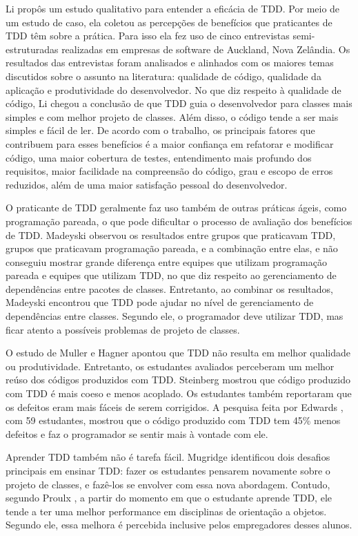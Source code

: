 \documentclass[conference]{IEEEtran}
\begin{document}
Li \cite{angela-li} propôs um estudo qualitativo para
entender a eficácia de TDD. Por meio de um estudo de caso, ela coletou as 
percepções de benefícios que praticantes de TDD têm sobre a prática. Para isso ela
fez uso de cinco entrevistas semi-estruturadas realizadas em empresas de software de 
Auckland, Nova Zelândia. Os resultados das entrevistas foram analisados e alinhados
com os maiores temas discutidos sobre o assunto na literatura: qualidade de código,
qualidade da aplicação e produtividade do desenvolvedor.
No que diz respeito à qualidade de código, Li chegou a conclusão de
que TDD guia o desenvolvedor para classes mais simples e com melhor projeto de classes. 
Além disso, o código tende a ser mais simples e fácil de ler.
De acordo com o trabalho, os principais fatores que contribuem para esses benefícios
é a maior confiança em refatorar e modificar código, uma maior cobertura de testes,
entendimento mais profundo dos requisitos, maior facilidade na compreensão do código,
grau e escopo de erros reduzidos, além de uma maior satisfação pessoal do desenvolvedor.

O praticante de TDD geralmente faz uso também de outras práticas ágeis, como
programação pareada, o que pode dificultar o processo de avaliação dos benefícios
de TDD. Madeyski \cite{madeyski-package-dependencies} observou os resultados
entre grupos que praticavam TDD, grupos que praticavam programação pareada, 
e a combinação entre elas,
e não conseguiu mostrar grande diferença entre equipes que utilizam programação 
pareada e equipes que utilizam TDD, no que diz respeito ao gerenciamento de dependências entre 
pacotes de classes. Entretanto, ao combinar os resultados, Madeyski encontrou que TDD pode 
ajudar no nível de gerenciamento de dependências entre classes. Segundo ele, o 
programador deve utilizar TDD, mas ficar atento a possíveis problemas de projeto de classes.

O estudo de Muller e Hagner \cite{muller-e-hagner} apontou que TDD não resulta
em melhor qualidade ou produtividade. Entretanto, os estudantes avaliados perceberam um 
melhor reúso dos códigos produzidos com TDD. Steinberg \cite{steinberg} mostrou
que código produzido com TDD é mais coeso e menos acoplado. Os estudantes também
reportaram que os defeitos eram mais fáceis de serem corrigidos. A pesquisa feita
por Edwards \cite{edwards}, com 59 estudantes, mostrou que o código produzido com
TDD tem 45\% menos defeitos e faz o programador se sentir mais à vontade
com ele.

Aprender TDD também não é tarefa fácil. Mugridge \cite{mugridge} identificou
dois desafios principais em ensinar TDD: fazer os estudantes
pensarem novamente sobre o projeto de classes, e fazê-los se envolver com essa nova
abordagem. 
Contudo, segundo Proulx \cite{proulx}, a partir do momento em que
o estudante aprende TDD, ele tende a ter uma melhor performance em disciplinas
de orientação a objetos. Segundo ele, essa melhora é percebida inclusive pelos
empregadores desses alunos.
\end{document}
